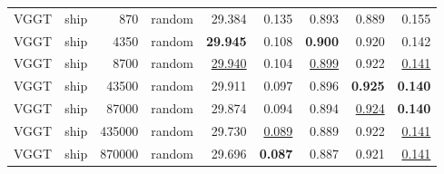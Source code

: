\begin{table}[H]
\begin{tabular}{llrlrrrrr}
VGGT & ship & 870 & random & 29.384 & 0.135 & 0.893 & 0.889 & 0.155 \\
VGGT & ship & 4350 & random & \textbf{29.945} & 0.108 & \textbf{0.900} & 0.920 & 0.142 \\
VGGT & ship & 8700 & random & \underline{29.940} & 0.104 & \underline{0.899} & 0.922 & \underline{0.141} \\
VGGT & ship & 43500 & random & 29.911 & 0.097 & 0.896 & \textbf{0.925} & \textbf{0.140} \\
VGGT & ship & 87000 & random & 29.874 & 0.094 & 0.894 & \underline{0.924} & \textbf{0.140} \\
VGGT & ship & 435000 & random & 29.730 & \underline{0.089} & 0.889 & 0.922 & \underline{0.141} \\
VGGT & ship & 870000 & random & 29.696 & \textbf{0.087} & 0.887 & 0.921 & \underline{0.141} \\
\bottomrule
\end{tabular}
\end{table}